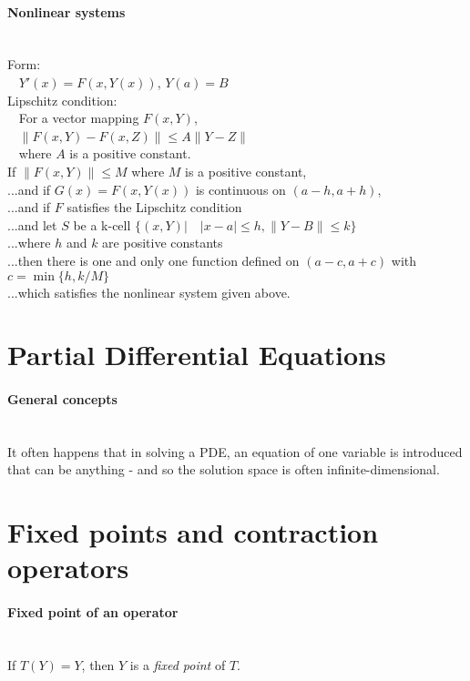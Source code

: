 \documentclass[10pt]{article}
\begin{document}
\paragraph{Nonlinear systems}\ \\
Form:\\
$\phantom{x}$ $Y'(x) = F(x, Y(x))$, $Y(a) = B$\\
Lipschitz condition:\\
$\phantom{x}$ For a vector mapping $F(x, Y)$,\\
$\phantom{x}$ $\lVert F(x, Y) - F(x, Z) \rVert \leq A \lVert Y - Z \rVert$\\
$\phantom{x}$ where $A$ is a positive constant.\\
If $\lVert F(x, Y) \rVert \leq M$ where $M$ is a positive constant,\\
...and if $G(x) = F(x, Y(x))$ is continuous on $(a-h, a+h)$,\\
...and if $F$ satisfies the Lipschitz condition\\
...and let $S$ be a k-cell $\{(x, Y) | \quad |x-a| \leq h, \lVert Y - B \rVert \leq k\}$\\
...where $h$ and $k$ are positive constants\\
...then there is one and only one function defined on $(a-c,a+c)$ with $c = \min\{h,k/M\}$\\
...which satisfies the nonlinear system given above.



\bigskip\bigskip
\section{Partial Differential Equations}\smallskip

\paragraph{General concepts}\ \\
It often happens that in solving a PDE, an equation of one variable is introduced\\
that can be anything - and so the solution space is often infinite-dimensional.




\bigskip\bigskip
\section{Fixed points and contraction operators}\smallskip

\paragraph{Fixed point of an operator}\ \\
If $T(Y) = Y$, then $Y$ is a {\it fixed point} of $T$.
\end{document}

